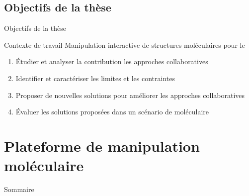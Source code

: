\documentclass[english,french,dvips,10pt]{mybeamer}
\begin{document}
	\subsection{Objectifs de la thèse}
	\begin{myframe}{Objectifs de la thèse}
		\begin{myblock}{Contexte de travail}
			Manipulation interactive de structures moléculaires pour le \mydocking
		\end{myblock}
		\vfill
		\begin{enumerate}
			\item Étudier et analyser la contribution les approches collaboratives
				\vfill
			\item Identifier et caractériser les limites et les contraintes
				\vfill
			\item Proposer de nouvelles solutions pour améliorer les approches collaboratives
				\vfill
			\item Évaluer les solutions proposées dans un scénario de \mydocking moléculaire
		\end{enumerate}
		\vfill
	\end{myframe}
	\section{Plateforme de manipulation moléculaire \myShaddock}
	\begin{myframe}{Sommaire}
		\tableofcontents[sectionstyle=show/shaded,subsectionstyle=show/show/hide,subsubsectionstyle=show/show/hide]
	\end{myframe}
\end{document}
